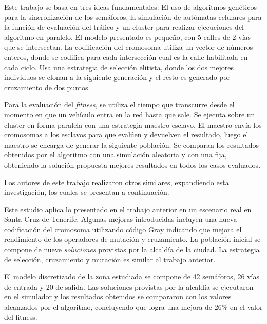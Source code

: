 \begin{itemize}
\begin{item}

  
Este trabajo se basa en tres ideas fundamentales: El uso de algoritmos genéticos para la sincronización de los semáforos, la simulación de autómatas celulares para la función de evaluación del tráfico y un cluster para realizar ejecuciones del algoritmo en paralelo.
El modelo presentado es pequeño, con 5 calles de 2 vías que se intersectan. La codificación del cromosoma utiliza un vector de números enteros, donde se codifica para cada intersección cual es la calle habilitada en cada ciclo. Usa una estrategia de selección elitista, donde los dos mejores individuos se clonan a la siguiente generación y el resto es generado por cruzamiento de dos puntos.

Para la evaluación del \emph{fitness}, se utiliza el tiempo que transcurre desde el momento en que un vehículo entra en la red hasta que sale. Se ejecuta sobre un cluster en forma paralela con una estrategia maestro-esclavo. El maestro envía los cromosomas a los esclavos para que evalúen y devuelven el resultado, luego el maestro se encarga de generar la siguiente población.
Se comparan los resultados obtenidos por el algoritmo con una simulación aleatoria y con una fija, obteniendo la solución propuesta mejores resultados en todos los casos evaluados.
	
Los autores de este trabajo realizaron otros similares, expandiendo esta investigación, los cuales se presentan a continuación.
\end{item}
	
\begin{item}

Este estudio aplica lo presentado en el trabajo anterior en un escenario real en Santa Cruz de Tenerife. Algunas mejoras introducidas incluyen una nueva codificación del cromosoma utilizando código Gray indicando que mejora el rendimiento de los operadores de mutación y cruzamiento. La población inicial se compone de nueve \emph{soluciones} provistas por la alcaldía de la ciudad. La estrategia de selección, cruzamiento y mutación es similar al trabajo anterior.

El modelo discretizado de la zona estudiada se compone de 42 semáforos, 26 vías de entrada y 20 de salida. Las soluciones provistas por la alcaldía se ejecutaron en el simulador y los resultados obtenidos se compararon con los valores alcanzados  por el algoritmo, concluyendo que logra una mejora de 26\% en el valor del fitness.


\end{item}
\end{itemize}
